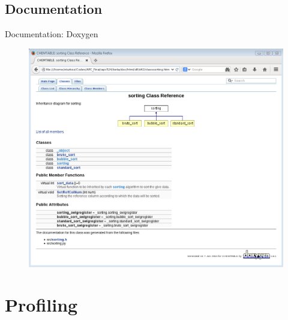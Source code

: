 \documentclass{beamer}
\begin{document}

\subsection{Documentation}
\begin{frame}{Documentation: Doxygen}
\begin{figure}
\includegraphics[scale=0.35]{doxygen.png}
\end{figure}

\end{frame}


\section{Profiling}
\end{document}
